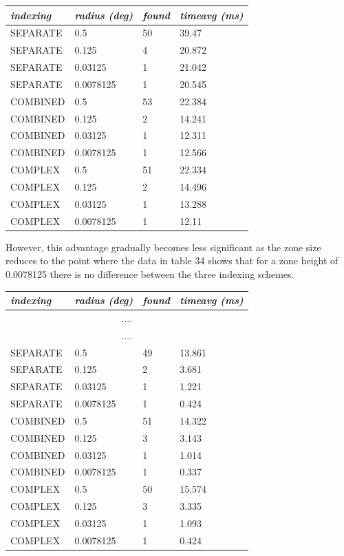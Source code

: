 \documentclass{article}
\begin{document}
\begin{table}[hbt!]
\centering
\begin{tabular}{|l|l|l|l|}
\hline
\textit{indexing} & \textit{radius (deg)} & \textit{found} & \textit{timeavg (ms)} \\ \hline
SEPARATE & 0.5 & 50 & 39.47 \\ \hline
SEPARATE & 0.125 & 4 & 20.872 \\ \hline
SEPARATE & 0.03125 & 1 & 21.042 \\ \hline
SEPARATE & 0.0078125 & 1 & 20.545 \\ \hline
COMBINED & 0.5 & 53 & 22.384 \\ \hline
COMBINED & 0.125 & 2 & 14.241 \\ \hline
COMBINED & 0.03125 & 1 & 12.311 \\ \hline
COMBINED & 0.0078125 & 1 & 12.566 \\ \hline
COMPLEX  & 0.5 & 51 & 22.334 \\ \hline
COMPLEX  & 0.125 & 2 & 14.496 \\ \hline
COMPLEX  & 0.03125 & 1 & 13.288 \\ \hline
COMPLEX  & 0.0078125 & 1 & 12.11 \\ \hline
\end{tabular}
\end{table}

However, this advantage gradually becomes less significant as the zone size reduces to the point where the data in table 34 shows that for a zone height of 0.0078125 there is no difference between the three indexing schemes.

\begin{table}[hbt!]
\centering
\begin{tabular}{|l|l|l|l|}
\hline
\textit{indexing} & \textit{radius (deg)} & \textit{found} & \textit{timeavg (ms)} \\ \hline
\multicolumn{4}{|c|}{....} \\ \hline
\multicolumn{4}{|c|}{....} \\ \hline
SEPARATE & 0.5 & 49 & 13.861 \\ \hline
SEPARATE & 0.125 & 2 & 3.681 \\ \hline
SEPARATE & 0.03125 & 1 & 1.221 \\ \hline
SEPARATE & 0.0078125 & 1 & 0.424 \\ \hline
COMBINED & 0.5 & 51 & 14.322 \\ \hline
COMBINED & 0.125 & 3 & 3.143 \\ \hline
COMBINED & 0.03125 & 1 & 1.014 \\ \hline
COMBINED & 0.0078125 & 1 & 0.337 \\ \hline
COMPLEX & 0.5 & 50 & 15.574 \\ \hline
COMPLEX & 0.125 & 3 & 3.335 \\ \hline
COMPLEX & 0.03125 & 1 & 1.093 \\ \hline
COMPLEX & 0.0078125 & 1 & 0.424 \\ \hline
\end{tabular}
\end{table}
\end{document}
